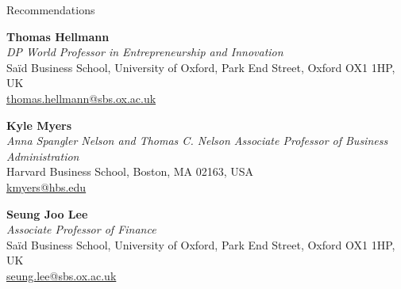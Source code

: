 \documentclass{resume} %
\begin{document}
\begin{rSection}{Recommendations}

\textbf{Thomas Hellmann} \\
\textit{DP World Professor in Entrepreneurship and Innovation} \\
Sa\"{i}d Business School, University of Oxford, Park End Street, Oxford OX1 1HP, UK \\
\href{mailto:thomas.hellmann@sbs.ox.ac.uk}{thomas.hellmann@sbs.ox.ac.uk}

\smallskip
\textbf{Kyle Myers} \\
\textit{Anna Spangler Nelson and Thomas C. Nelson Associate Professor of Business Administration} \\
Harvard Business School, Boston, MA 02163, USA \\
\href{mailto:kmyers@hbs.edu}{kmyers@hbs.edu}


\smallskip
\textbf{Seung Joo Lee} \\
\textit{Associate Professor of Finance} \\
Sa\"{i}d Business School, University of Oxford, Park End Street, Oxford OX1 1HP, UK \\
\href{mailto:seung.lee@sbs.ox.ac.uk}{seung.lee@sbs.ox.ac.uk}

\end{rSection}
\end{document}
